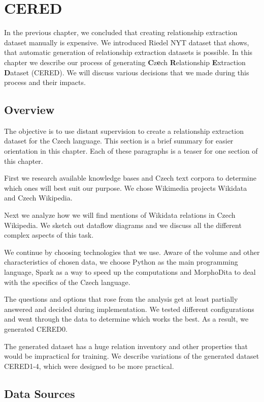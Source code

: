\chapter{CERED}

In the previous chapter, we concluded that creating relationship extraction dataset manually is expensive. We introduced Riedel NYT dataset that shows, that automatic generation of relationship extraction datasets is possible. In this chapter we describe our process of generating \textbf{C}z\textbf{e}ch \textbf{R}elationship \textbf{E}xtraction \textbf{D}ataset (CERED). We will discuss various decisions that we made during this process and their impacts.


\section{Overview}

The objective is to use distant supervision to create a relationship extraction dataset for the Czech language. This section is a brief summary for easier orientation in this chapter. Each of these paragraphs is a teaser for one section of this chapter.

First we research available knowledge bases and Czech text corpora to determine which ones will best suit our purpose. We chose Wikimedia projects Wikidata and Czech Wikipedia.

Next we analyze how we will find mentions of Wikidata relations in Czech Wikipedia. We sketch out dataflow diagrams and we discuss all the different complex aspects of this task.

We continue by choosing technologies that we use. Aware of the volume and other characteristics of chosen data, we choose Python as the main programming language, Spark as a way to speed up the computations and MorphoDita to deal with the specifics of the Czech language.

The questions and options that rose from the analysis get at least partially answered and decided during implementation. We tested different configurations and went through the data to determine which works the best. As a result, we generated CERED0.

The generated dataset has a huge relation inventory and other properties that would be impractical for training. We describe variations of the generated dataset CERED1-4, which were designed to be more practical.



\section{Data Sources}

